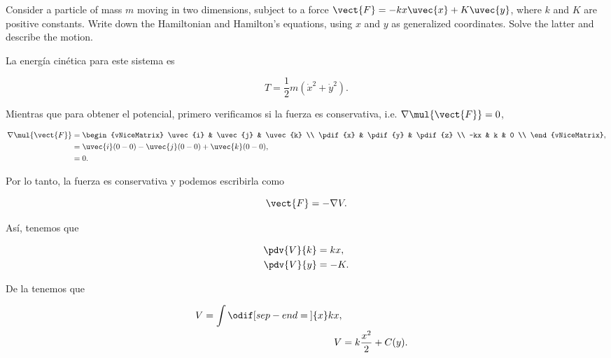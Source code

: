 \documentclass[../main.tex]{subfiles}
\begin{document}
\begin{problema}
	Consider a particle of mass \(m\) moving in two dimensions, subject
	to a force \(\vect{F} = -kx \uvec{x} + K \uvec{y}\), where \(k\)
	and \(K\) are positive constants. Write down the Hamiltonian and
	Hamilton's equations, using \(x\) and \(y\) as generalized
	coordinates. Solve the latter and describe the motion.

	\startsolution

	La energía cinética para este sistema es

	\begin{equation}
		T = \dfrac{1}{2}m(\dot{x}^{2} + \dot{y}^{2}).
		\label{eq:T-p3}
	\end{equation}

	Mientras que para obtener el potencial, primero verificamos si
	la fuerza es conservativa, i.e. \(\nabla \mul{\vect{F}} = 0\),

	\begin{align*}
		\nabla \mul{\vect{F}} & =
		\begin{vNiceMatrix}
			\uvec{i} & \uvec{j} & \uvec{k} \\
			\pdif{x} & \pdif{y} & \pdif{z} \\
			-kx      & k        & 0        \\
		\end{vNiceMatrix},                                                 \\
		                      & = \uvec{i}(0 - 0) - \uvec{j}(0 - 0) + \uvec{k}(0 - 0), \\
		                      & = 0.
	\end{align*}

	Por lo tanto, la fuerza es conservativa y podemos escribirla como

	\begin{equation*}
		\vect{F} = - \nabla{V}.
	\end{equation*}

	Así, tenemos que

	\begin{align}
		\pdv{V}{k} & = kx\label{eq:V_x}, \\
		\pdv{V}{y} & = -K.\label{eq:V_y}
	\end{align}

	De la  tenemos que

	\begin{align*}
		V = \int \odif[sep-end=\medspace]{x} kx, \\
		V & = k \dfrac{x^{2}}{2} + C(y).
	\end{align*}


\end{problema}
\end{document}
